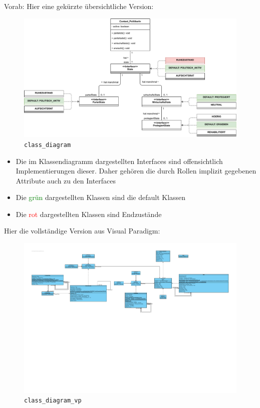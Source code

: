\documentclass{article}
\begin{document}
\begin{enumerate}[label=\alph*.]
            Vorab: Hier eine gekürzte übersichtliche Version:

            \begin{figure}[ht]
                \includegraphics[width=\textwidth]{swt_wende_tim_h10_class_diagram.pdf}
                \caption{\texttt{class\_diagram}}
            \end{figure}
            
            \begin{itemize}
                \item Die im Klassendiagramm dargestellten Interfaces sind offensichtlich Implementierungen dieser.
                    Daher gehören die durch Rollen implizit gegebenen Attribute auch zu den Interfaces
                \item Die \textcolor{green}{grün} dargestellten Klassen sind die default Klassen
                \item Die \textcolor{red}{rot} dargestellten Klassen sind Endzustände
            \end{itemize}

            \newpage
            Hier die vollständige Version aus Visual Paradigm:

            \begin{figure}[ht]
                \includegraphics[trim=0cm 10cm 0cm 0cm, width=\textwidth]{swt_wende_tim_h10_class_diagram_vp.pdf}
                \caption{\texttt{class\_diagram\_vp}}
            \end{figure}


\end{enumerate}
\end{document}
